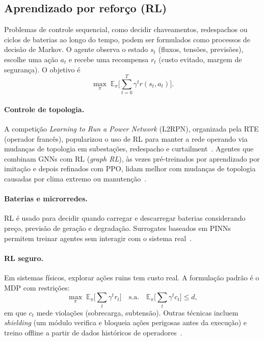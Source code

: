 \documentclass[11pt,a4paper]{article}
\begin{document}
\subsection{Aprendizado por reforço (RL)}

Problemas de controle sequencial, como decidir chaveamentos, redespachos ou
ciclos de baterias ao longo do tempo, podem ser formulados como processos de
decisão de Markov. O agente observa o estado $s_t$ (fluxos, tensões,
previsões), escolhe uma ação $a_t$ e recebe uma recompensa $r_t$ (custo
evitado, margem de segurança). O objetivo é
\begin{equation}
  \max_\pi \; \mathbb{E}_\pi\Big[\sum_{t=0}^{T} \gamma^t r(s_t, a_t)\Big].
\end{equation}

\paragraph{Controle de topologia.} A competição \textit{Learning to Run a
Power Network} (L2RPN), organizada pela RTE (operador francês), popularizou o
uso de RL para manter a rede operando via mudanças de topologia em
subestações, redespacho e curtailment~\cite{l2rpn}. Agentes que combinam GNNs
com RL (\textit{graph RL}), às vezes pré-treinados por aprendizado por
imitação e depois refinados com PPO, lidam melhor com mudanças de topologia
causadas por clima extremo ou manutenção~\cite{graphrlsurvey,ppognn}.

\paragraph{Baterias e microrredes.} RL é usado para decidir quando carregar e
descarregar baterias considerando preço, previsão de geração e degradação.
Surrogates baseados em PINNs permitem treinar agentes sem interagir com o
sistema real~\cite{rlpinn}.

\paragraph{RL seguro.} Em sistemas físicos, explorar ações ruins tem custo
real. A formulação padrão é o MDP com restrições:
\begin{equation}
  \max_\pi \; \mathbb{E}_\pi\Big[\sum_t \gamma^t r_t\Big]
  \quad \text{s.a.} \quad
  \mathbb{E}_\pi\Big[\sum_t \gamma^t c_t\Big] \le d,
\end{equation}
em que $c_t$ mede violações (sobrecarga, subtensão). Outras técnicas incluem
\textit{shielding} (um módulo verifica e bloqueia ações perigosas antes da
execução) e treino offline a partir de dados históricos de operadores~\cite{saferl}.
\end{document}
